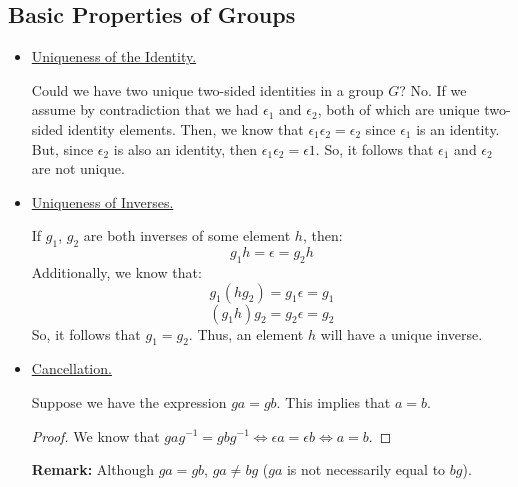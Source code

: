 \documentclass[letterpaper]{article}
\begin{document}
\subsection{Basic Properties of Groups}
\begin{itemize}
    \item \underline{Uniqueness of the Identity.} 

    Could we have two unique two-sided identities in a group $G$? No. If we assume by contradiction that we had $\epsilon_1$ and $\epsilon_2$, both of which are unique two-sided identity elements. Then, we know that $\epsilon_1 \epsilon_2 = \epsilon_2$ since $\epsilon_1$ is an identity. But, since $\epsilon_2$ is also an identity, then $\epsilon_1 \epsilon_2 = \epsilon1$. So, it follows that $\epsilon_1$ and $\epsilon_2$ are not unique. 

    \item \underline{Uniqueness of Inverses.}
    
    If $g_1$, $g_2$ are both inverses of some element $h$, then:
    \[g_1 h = \epsilon = g_2 h\]
    Additionally, we know that:
    \[g_1 (h g_2) = g_1 \epsilon = g_1\]
    \[(g_1 h) g_2 = g_2 \epsilon = g_2\]
    So, it follows that $g_1 = g_2$. Thus, an element $h$ will have a unique inverse. 

    \item \underline{Cancellation.}
    
    Suppose we have the expression $ga = gb$. This implies that $a = b$. 

    \begin{proof}
        We know that $gag^{-1} = gbg^{-1} \iff \epsilon a = \epsilon b \iff a = b$. 
    \end{proof}

    \textbf{Remark:} Although $ga = gb$, $ga \neq bg$ ($ga$ is not necessarily equal to $bg$). 
\end{itemize}
\end{document}
